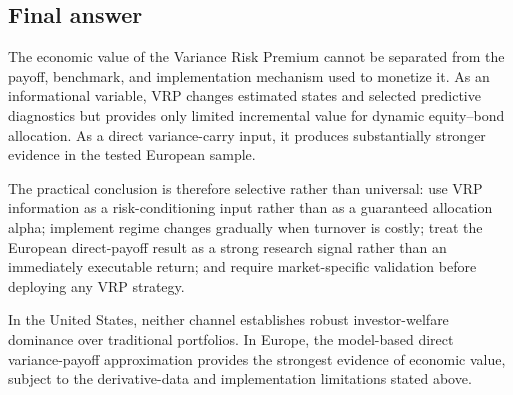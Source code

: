 \subsection{Final answer}

The economic value of the Variance Risk Premium cannot be separated from the payoff,
benchmark, and implementation mechanism used to monetize it. As an informational variable,
VRP changes estimated states and selected predictive diagnostics but provides only limited
incremental value for dynamic equity--bond allocation. As a direct variance-carry input, it
produces substantially stronger evidence in the tested European sample.

The practical conclusion is therefore selective rather than universal: use VRP information as
a risk-conditioning input rather than as a guaranteed allocation alpha; implement regime
changes gradually when turnover is costly; treat the European direct-payoff result as a strong
research signal rather than an immediately executable return; and require market-specific
validation before deploying any VRP strategy.

In the United States, neither channel establishes robust investor-welfare dominance over
traditional portfolios. In Europe, the model-based direct variance-payoff approximation provides
the strongest evidence of economic value, subject to the derivative-data and implementation
limitations stated above.
